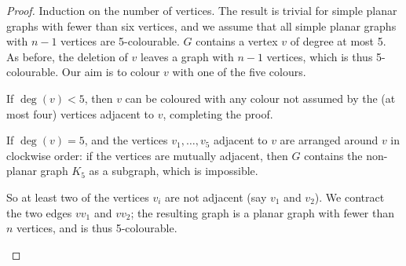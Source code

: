 \documentclass[11pt]{scrartcl}
\theoremstyle{plain}
\theoremstyle{remark}
\begin{document}
\begin{proof}
Induction on the number of vertices. The result is trivial for simple planar graphs with fewer than six vertices, and we assume that all simple planar graphs with $n-1$ vertices are 5-colourable. $G$ contains a vertex $v$ of degree at most 5. As before, the deletion of $v$ leaves a graph with $n-1$ vertices, which is thus 5-colourable. Our aim is to colour $v$ with one of the five colours.

If $\deg(v) < 5$, then $v$ can be coloured with any colour not assumed by the (at most four) vertices adjacent to $v$, completing the proof.

If $\deg(v) = 5$, and the vertices $v_1, \dots, v_5$ adjacent to $v$ are arranged around $v$ in clockwise order: if the vertices are mutually adjacent, then $G$ contains the non-planar graph $K_5$ as a subgraph, which is impossible.

\begin{center}
\end{center}

So at least two of the vertices $v_i$ are not adjacent (say $v_1$ and $v_2$). We contract the two edges $vv_1$ and $vv_2$; the resulting graph is a planar graph with fewer than $n$ vertices, and is thus 5-colourable.

\begin{center}
\end{center}
\end{proof}
\end{document}
